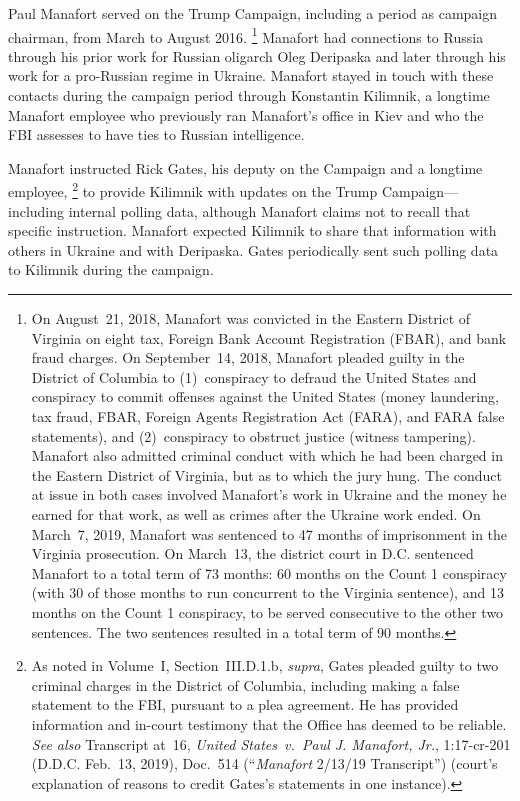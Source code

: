 Paul Manafort served on the Trump Campaign, including a period as campaign chairman, from March to August 2016.%
\footnote{On August~21, 2018, Manafort was convicted in the Eastern District of Virginia on eight tax, Foreign Bank Account Registration (FBAR), and bank fraud charges. On September~14, 2018, Manafort pleaded guilty in the District of Columbia to (1)~conspiracy to defraud the United States and conspiracy to commit offenses against the United States (money laundering, tax fraud, FBAR, Foreign Agents Registration Act (FARA), and FARA false statements), and (2)~conspiracy to obstruct justice (witness tampering).
Manafort also admitted criminal conduct with which he had been charged in the Eastern District of Virginia, but as to which the jury hung.
The conduct at issue in both cases involved Manafort's work in Ukraine and the money he earned for that work, as well as crimes after the Ukraine work ended. On March~7, 2019, Manafort was sentenced to 47 months of imprisonment in the Virginia prosecution.
On March~13, the district court in D.C. sentenced Manafort to a total term of 73 months: 60 months on the Count 1 conspiracy (with 30 of those months to run concurrent to the Virginia sentence), and 13 months on the Count 1 conspiracy, to be served consecutive to the other two sentences.
The two sentences resulted in a total term of 90 months.
}
Manafort had connections to Russia through his prior work for Russian oligarch Oleg Deripaska and later through his work for a pro-Russian regime in Ukraine.
Manafort stayed in touch with these contacts during the campaign period through Konstantin Kilimnik, a longtime Manafort employee who previously ran Manafort's office in Kiev and who the FBI assesses to have ties to Russian intelligence.

Manafort instructed Rick Gates, his deputy on the Campaign and a longtime employee,%
\footnote{As noted in Volume~I, Section~III.D.1.b, \textit{supra}, Gates pleaded guilty to two criminal charges in the District of Columbia, including making a false statement to the FBI, pursuant to a plea agreement.
He has provided information and in-court testimony that the Office has deemed to be reliable. \textit{See also} Transcript at~16, \textit{United States~v.\ Paul J. Manafort, Jr.}, 1:17-cr-201 (D.D.C. Feb.~13, 2019), Doc.~514 (``\textit{Manafort} 2/13/19 Transcript'') (court's explanation of reasons to credit Gates's statements in one instance).}
to provide Kilimnik with updates on the Trump Campaign---including internal polling data, although Manafort claims not to recall that specific instruction.
Manafort expected Kilimnik to share that information with others in Ukraine and with Deripaska.
Gates periodically sent such polling data to Kilimnik during the campaign.

